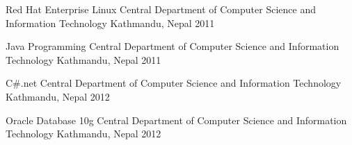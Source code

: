 

\begin{cvhonors}

  \cvhonor
    {Red Hat Enterprise Linux} %
    {Central Department of Computer Science and Information Technology} %
    {Kathmandu, Nepal} %
    {2011} %

  \cvhonor
    {Java Programming} %
    {Central Department of Computer Science and Information Technology} %
    {Kathmandu, Nepal} %
    {2011} %

  \cvhonor
    {C\#.net} %
    {Central Department of Computer Science and Information Technology} %
    {Kathmandu, Nepal} %
    {2012} %

  \cvhonor
    {Oracle Database 10g} %
    {Central Department of Computer Science and Information Technology} %
    {Kathmandu, Nepal} %
    {2012} %

\end{cvhonors}
